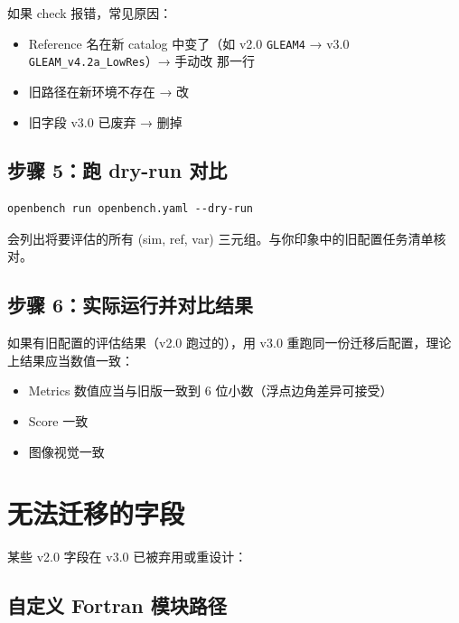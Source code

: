 如果 check 报错，常见原因：

\begin{itemize}
  \item Reference 名在新 catalog 中变了（如 v2.0 \texttt{GLEAM4} → v3.0 \texttt{GLEAM\_v4.2a\_LowRes}）→ 手动改  那一行
  \item 旧路径在新环境不存在 → 改 
  \item 旧字段 v3.0 已废弃 → 删掉
\end{itemize}

\subsection{步骤 5：跑 dry-run 对比}

\begin{verbatim}
openbench run openbench.yaml --dry-run
\end{verbatim}

\openbench{} 会列出将要评估的所有 (sim, ref, var) 三元组。与你印象中的旧配置任务清单核对。

\subsection{步骤 6：实际运行并对比结果}

如果有旧配置的评估结果（v2.0 跑过的），用 v3.0 重跑同一份迁移后配置，理论上结果应当数值一致：

\begin{itemize}
  \item Metrics 数值应当与旧版一致到 6 位小数（浮点边角差异可接受）
  \item Score 一致
  \item 图像视觉一致
\end{itemize}


\section{无法迁移的字段}

某些 v2.0 字段在 v3.0 已被弃用或重设计：

\subsection{自定义 Fortran 模块路径}


